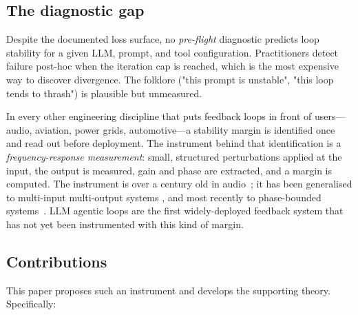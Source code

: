 \documentclass[11pt,a4paper]{article}
\theoremstyle{definition}
\theoremstyle{remark}
\begin{document}
\subsection{The diagnostic gap}

Despite the documented loss surface, no \emph{pre-flight} diagnostic
predicts loop stability for a given LLM, prompt, and tool configuration.
Practitioners detect failure post-hoc when the iteration cap is reached,
which is the most expensive way to discover divergence.  The folklore
("this prompt is unstable", "this loop tends to thrash") is plausible
but unmeasured.

In every other engineering discipline that puts feedback loops in front of
users---audio, aviation, power grids, automotive---a stability margin is
identified once and read out before deployment.  The instrument behind
that identification is a \emph{frequency-response measurement}: small,
structured perturbations applied at the input, the output is measured,
gain and phase are extracted, and a margin is computed.
The instrument is over a century old in audio~\citep{Bode1945Network}; it
has been generalised to multi-input multi-output systems
\citep{Anderson1973NetworkAnalysis,Megretski1997IQC,Iwasaki2005GeneralizedKYP},
and most recently to phase-bounded systems~\citep{Chen2023PhaseTheory}.
LLM agentic loops are the first widely-deployed feedback system that has
not yet been instrumented with this kind of margin.

\subsection{Contributions}

This paper proposes such an instrument and develops the supporting theory.
Specifically:
\end{document}
